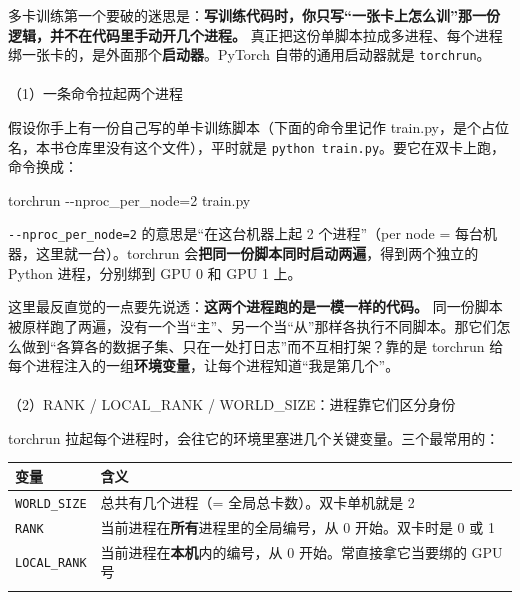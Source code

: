 \documentclass[
  chinese,
]{ctexart}
\makeatletter
\let\oldparagraph\paragraph
\renewcommand{\paragraph}{
    \@ifstar
      \xxxParagraphStar
      \xxxParagraphNoStar
  }
\newcommand{\xxxParagraphStar}[1]{\oldparagraph*{#1}\mbox{}}
\newcommand{\xxxParagraphNoStar}[1]{\oldparagraph{#1}\mbox{}}
\newenvironment{Shaded}{\begin{snugshade}}{\end{snugshade}}
\newcommand{\AttributeTok}[1]{\textcolor[rgb]{0.40,0.45,0.13}{#1}}
\newcommand{\ExtensionTok}[1]{\textcolor[rgb]{0.00,0.23,0.31}{#1}}
\newcommand{\NormalTok}[1]{\textcolor[rgb]{0.00,0.23,0.31}{#1}}
\newcommand{\OperatorTok}[1]{\textcolor[rgb]{0.37,0.37,0.37}{#1}}
\makeatother
\begin{document}
多卡训练第一个要破的迷思是：\textbf{写训练代码时，你只写``一张卡上怎么训''那一份逻辑，并不在代码里手动开几个进程。}
真正把这份单脚本拉成多进程、每个进程绑一张卡的，是外面那个\textbf{启动器}。PyTorch
自带的通用启动器就是 \texttt{torchrun}。

\paragraph{（1）一条命令拉起两个进程}\label{ux4e00ux6761ux547dux4ee4ux62c9ux8d77ux4e24ux4e2aux8fdbux7a0b}

假设你手上有一份自己写的单卡训练脚本（下面的命令里记作
train.py，是个占位名，本书仓库里没有这个文件），平时就是
\texttt{python\ train.py}。要它在双卡上跑，命令换成：

\begin{Shaded}
\begin{Highlighting}[]
\ExtensionTok{torchrun} \AttributeTok{{-}{-}nproc\_per\_node}\OperatorTok{=}\NormalTok{2 train.py}
\end{Highlighting}
\end{Shaded}

\texttt{-\/-nproc\_per\_node=2} 的意思是``在这台机器上起 2 个进程''（per
node = 每台机器，这里就一台）。torchrun
会\textbf{把同一份脚本同时启动两遍}，得到两个独立的 Python
进程，分别绑到 GPU 0 和 GPU 1 上。

这里最反直觉的一点要先说透：\textbf{这两个进程跑的是一模一样的代码。}
同一份脚本被原样跑了两遍，没有一个当``主''、另一个当``从''那样各执行不同脚本。那它们怎么做到``各算各的数据子集、只在一处打日志''而不互相打架？靠的是
torchrun
给每个进程注入的一组\textbf{环境变量}，让每个进程知道``我是第几个''。

\paragraph{（2）RANK / LOCAL\_RANK /
WORLD\_SIZE：进程靠它们区分身份}\label{rank-local_rank-world_sizeux8fdbux7a0bux9760ux5b83ux4eecux533aux5206ux8eabux4efd}

torchrun 拉起每个进程时，会往它的环境里塞进几个关键变量。三个最常用的：

\begin{center}
\begin{tabular}{@{}>{\raggedright\arraybackslash}p{} >{\raggedright\arraybackslash}p{}@{}}
\toprule\noalign{}
变量 & 含义 \\
\midrule\noalign{}
\texttt{WORLD\_\allowbreak SIZE} & 总共有几个进程（= 全局总卡数）。双卡单机就是 2 \\
\texttt{RANK} & 当前进程在\textbf{所有}进程里的全局编号，从 0 开始。双卡时是 0 或 1 \\
\texttt{LOCAL\_\allowbreak RANK} & 当前进程在\textbf{本机}内的编号，从 0 开始。常直接拿它当要绑的 GPU 号 \\
\bottomrule\noalign{}
\end{tabular}
\end{center}
\end{document}
